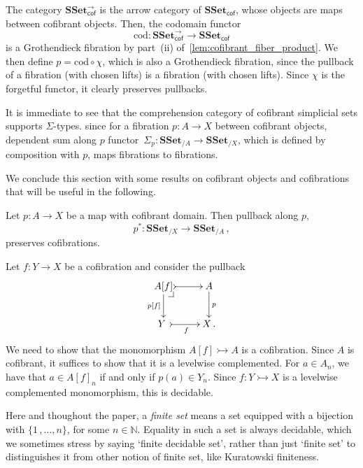 \documentclass[reqno,10pt,a4paper,oneside]{amsart}
\makeatletter
\renewenvironment{proof}[1][\proofname] {\par\pushQED{\qed}\normalfont\topsep6\p@\@plus6\p@\relax\trivlist\item[\hskip\labelsep\bf#1\@addpunct{.}]\ignorespaces}{\popQED\endtrivlist\@endpefalse}
\numberwithin{equation}{section}
\theoremstyle{mythm}
\theoremstyle{mydef}
\theoremstyle{myrmk}
\newcommand{\pullback}[1]{\save*!/#1-1.2pc/#1:(-1,1)@^{|-}\restore}
\newcommand{\drpullback}{\pullback{dr}}
\newcommand{\co}{\colon}
\newcommand{\SSet}{\mathbf{SSet}}
\makeatother
\begin{document}
\begin{proof} The category $\SSet^\to_{\mathsf{cof}}$ is the arrow category of $\SSet_{\mathsf{cof}}$, whose objects are
maps  between cofibrant objects. Then, the codomain
functor 
\[
\mathrm{cod} \co \SSet^{\to}_{\mathsf{cof}} \to \SSet_{\mathsf{cof}}
\] 
is a Grothendieck fibration by part~(ii) of~\cref{lem:cofibrant_fiber_product}. We then define $p = \mathrm{cod} \circ \chi$, which
 is also a Grothendieck fibration, since the pullback of a fibration (with chosen lifts) is a fibration (with chosen lifts).
  Since $\chi$ is the forgetful functor, it clearly preserves pullbacks.
\end{proof}



\begin{remark} \label{thm:sigma-types} It is immediate to see that the comprehension category of cofibrant simplicial sets supports $\Sigma$-types. since for a fibration $p \co A \to X$ between cofibrant objects, dependent sum along $p$  functor~$\Sigma_p \co \SSet_{/A} \to \SSet_{/X}$, which is defined by
composition with $p$, maps fibrations to fibrations.
\end{remark}

\medskip


We conclude this section with some  results on cofibrant objects and cofibrations
that will be useful in the following. 


\begin{proposition} \label{thm:cof-pbk}  Let $p \co A \to X$  be a map with cofibrant domain.
Then pullback along $p$, \[
p^* \co \SSet_{/X} \to \SSet_{/A} \, , 
\]
preserves cofibrations. 
\end{proposition}

\begin{proof} Let $f \co Y \to X$ be a cofibration and consider the pullback
\[
\xymatrix{
A[f]  \ar@{>->}[r] \drpullback \ar[d]_-{p[f]} &  A \ar[d]^{p} \\
Y \ar@{>->}[r]_{f} \ & X \, .}
\]
We need to show that the monomorphism $A[f] \rightarrowtail A$ is a cofibration. 
Since $A$ is cofibrant, it suffices to show that it is a levelwise complemented. For $a \in A_n$, we have that $a \in A[f]_n$ if and only if $p(a) \in Y_n$. Since $f \co Y \rightarrowtail X$ is a levelwise complemented monomorphism, this is decidable.
\end{proof} 

Here and thoughout the paper, a {\em finite set} means a set equipped with a bijection with $\{1 \, , \ldots,  n \}$, for some $n \in \mathbb{N}$. Equality in such a set
is always decidable, which we sometimes stress by saying `finite decidable set', rather than just `finite set' to distinguishes it from other notion of finite set, like Kuratowski finiteness.
\end{document}

